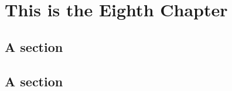 \documentclass[../ThesisMain]{subfiles}
\begin{document}
\doublespacing%
\chapter{This is the Eighth Chapter}\label{chap:8}
\section{A section}
\lipsum[0-1]

\section{A section}
\lipsum[0-1]
\end{document}

